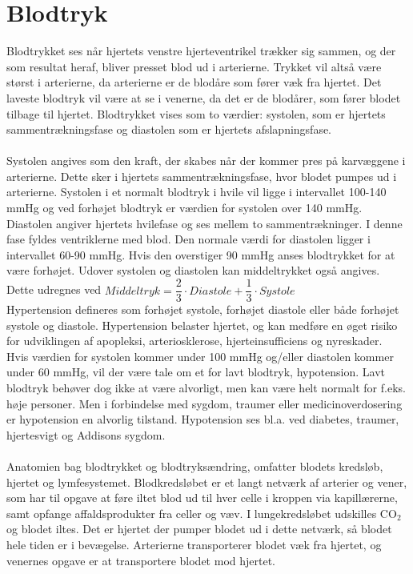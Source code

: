 \section{Blodtryk}
Blodtrykket ses når hjertets venstre hjerteventrikel trækker sig sammen, og der som resultat heraf, bliver presset blod ud i arterierne. Trykket vil altså være størst i arterierne, da arterierne er de blodåre som fører væk fra hjertet. Det laveste blodtryk vil være at se i venerne, da det er de blodårer, som fører blodet tilbage til hjertet. Blodtrykket vises som to værdier: systolen, som er hjertets sammentrækningsfase og diastolen som er hjertets afslapningsfase. \\\\
Systolen angives som den kraft, der skabes når der kommer pres på karvæggene i arterierne. Dette sker i hjertets sammentrækningsfase, hvor blodet pumpes ud i arterierne. Systolen i et normalt blodtryk i hvile vil ligge i intervallet 100-140 mmHg og ved forhøjet blodtryk er værdien for systolen over 140 mmHg.\\ Diastolen angiver hjertets hvilefase og ses mellem to sammentrækninger. I denne fase fyldes ventriklerne med blod. Den normale værdi for diastolen ligger i intervallet 60-90 mmHg. Hvis den overstiger 90 mmHg anses blodtrykket for at være forhøjet. Udover systolen og diastolen kan middeltrykket også angives. Dette udregnes ved $Middeltryk = \dfrac{2}{3}\cdot Diastole + \dfrac{1}{3}\cdot Systole$ \cite{blodtrykwiki}\\
Hypertension defineres som forhøjet systole, forhøjet diastole eller både forhøjet systole og diastole. Hypertension belaster hjertet, og kan medføre en øget risiko for udviklingen af apopleksi, arteriosklerose, hjerteinsufficiens og nyreskader. \cite{pulmonal}\\
Hvis værdien for systolen kommer under 100 mmHg og/eller diastolen kommer under 60 mmHg, vil der være tale om et for lavt blodtryk, hypotension. Lavt blodtryk behøver dog ikke at være alvorligt, men kan være helt normalt for f.eks. høje personer. Men i forbindelse med sygdom, traumer eller medicinoverdosering er hypotension en alvorlig tilstand. Hypotension ses bl.a. ved diabetes, traumer, hjertesvigt og Addisons sygdom. \cite{hypo}
\\\\
Anatomien bag blodtrykket og blodtryksændring, omfatter blodets kredsløb, hjertet og lymfesystemet. Blodkredsløbet er et langt netværk af arterier og vener, som har til opgave at føre iltet blod ud til hver celle i kroppen via kapillærerne, samt opfange affaldsprodukter fra celler og væv.\cite{pulmonal}  I lungekredsløbet udskilles CO$_2$ og blodet iltes. Det er hjertet der pumper blodet ud i dette netværk, så blodet hele tiden er i bevægelse. Arterierne transporterer blodet væk fra hjertet, og venernes opgave er at transportere blodet mod hjertet. 
